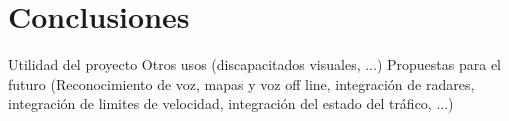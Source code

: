\chapter{Conclusiones}
\label{chap:conclusiones}

     Utilidad del proyecto
     Otros usos (discapacitados visuales, ...)
     Propuestas para el futuro (Reconocimiento de voz, mapas y voz off line, integración de radares, integración de limites de velocidad, integración del estado del tráfico, ...)

